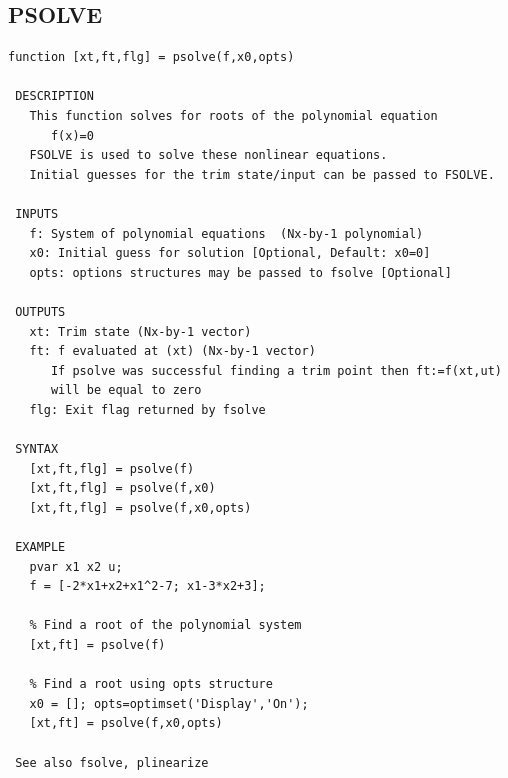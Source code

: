 \documentclass{article}
\begin{document}
\subsection{PSOLVE}
\begin{verbatim}
function [xt,ft,flg] = psolve(f,x0,opts)

 DESCRIPTION
   This function solves for roots of the polynomial equation
      f(x)=0
   FSOLVE is used to solve these nonlinear equations.
   Initial guesses for the trim state/input can be passed to FSOLVE.

 INPUTS
   f: System of polynomial equations  (Nx-by-1 polynomial)
   x0: Initial guess for solution [Optional, Default: x0=0]
   opts: options structures may be passed to fsolve [Optional]

 OUTPUTS
   xt: Trim state (Nx-by-1 vector)
   ft: f evaluated at (xt) (Nx-by-1 vector)
      If psolve was successful finding a trim point then ft:=f(xt,ut)
      will be equal to zero
   flg: Exit flag returned by fsolve

 SYNTAX
   [xt,ft,flg] = psolve(f)
   [xt,ft,flg] = psolve(f,x0)
   [xt,ft,flg] = psolve(f,x0,opts)

 EXAMPLE
   pvar x1 x2 u;
   f = [-2*x1+x2+x1^2-7; x1-3*x2+3];

   % Find a root of the polynomial system
   [xt,ft] = psolve(f)

   % Find a root using opts structure
   x0 = []; opts=optimset('Display','On');
   [xt,ft] = psolve(f,x0,opts)

 See also fsolve, plinearize

\end{verbatim}

\newpage
\end{document}
